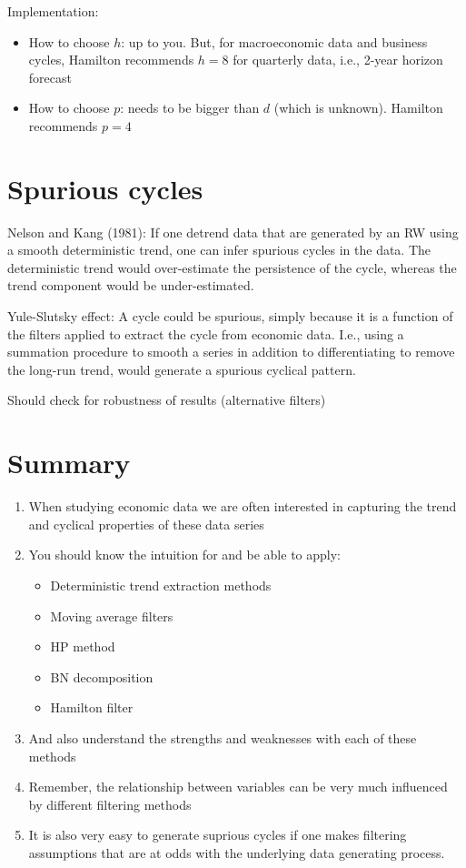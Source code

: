 \documentclass[10pt]{article}
\begin{document}
Implementation: 
\begin{itemize}
    \item How to choose $h $: up to you. But, for macroeconomic data and business cycles, Hamilton recommends $h = 8 $ for quarterly data, i.e., 2-year horizon forecast
    \item How to choose $p $: needs to be bigger than $d $ (which is unknown). Hamilton recommends $p = 4 $
\end{itemize}
\newpage 
\section{Spurious cycles}
Nelson and Kang (1981): If one detrend data that are generated by an RW using a smooth deterministic trend, one can infer spurious cycles in the data. The deterministic trend would over-estimate the persistence of the cycle, whereas the trend component would be under-estimated.

Yule-Slutsky effect: A cycle could be spurious, simply because it is a function of the filters applied to extract the cycle from economic data. I.e., using a summation procedure to smooth a series in addition to differentiating to remove the long-run trend, would generate a spurious cyclical pattern. 

Should check for robustness of results (alternative filters)
\section{Summary}
\begin{enumerate}
    \item When studying economic data we are often interested in capturing the trend and cyclical properties of these data series 
    \item You should know the intuition for and be able to apply: 
    \begin{itemize}
        \item Deterministic trend extraction methods 
        \item Moving average filters 
        \item HP method 
        \item BN decomposition
        \item Hamilton filter 
    \end{itemize}
    \item And also understand the strengths and weaknesses with each of these methods 
    \item Remember, the relationship between variables can be very much influenced by different filtering methods 
    \item It is also very easy to generate suprious cycles if one makes filtering assumptions that are at odds with the underlying data generating process. 
\end{enumerate}
\end{document}
